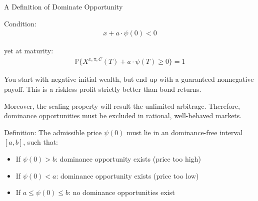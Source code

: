 \documentclass{beamer}
\begin{document}
\begin{frame}{A Definition of Dominate Opportunity}

    {\footnotesize \footnotesize
    \par Condition:
    \begin{align*}
         x + a \cdot \psi(0) < 0
    \end{align*}
    \par yet at maturity:
    \begin{align*}
        \mathbb{P}\{X^{x,\pi,C}(T) + a \cdot \psi(T) \geq 0\} = 1
    \end{align*}
    \par You start with negative initial wealth, but end up with a guaranteed nonnegative payoff. 
    This is a riskless profit strictly better than bond returns. 
    \vspace{1em}
    \par Moreover, 
    the scaling property will result the unlimited arbitrage.
     Therefore, dominance opportunities must be excluded in rational, well-behaved markets.
     \vspace{1em}
    \par Definition: The admissible price $\psi(0)$ must lie in an dominance-free interval $[a, b]$, such that:
    \begin{itemize}
        \item If $\psi(0) > b$: dominance opportunity exists (price too high)
        \item If $\psi(0) < a$: dominance opportunity exists (price too low)
        \item If $a \leq \psi(0) \leq b$: no dominance opportunities exist
    \end{itemize}
    }
\end{frame} 
\end{document}
